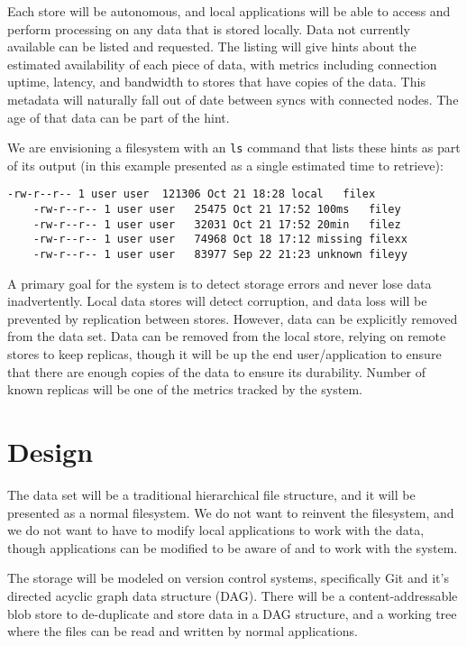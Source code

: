 \documentclass[12pt,a4paper,two-side]{book}
\begin{document}
Each store will be autonomous, and local applications will be able to access and
perform processing on any data that is stored locally. Data not currently
available can be listed and requested. The listing will give hints about the
estimated availability of each piece of data, with metrics including connection
uptime, latency, and bandwidth to stores that have copies of the data. This
metadata will naturally fall out of date between syncs with connected nodes. The
age of that data can be part of the hint.

We are envisioning a filesystem with an \lstinline{ls} command that lists these
hints as part of its output (in this example presented as a single estimated
time to retrieve):

\begin{lstlisting}[caption=Example ls output]
    -rw-r--r-- 1 user user  121306 Oct 21 18:28 local   filex
    -rw-r--r-- 1 user user   25475 Oct 21 17:52 100ms   filey
    -rw-r--r-- 1 user user   32031 Oct 21 17:52 20min   filez
    -rw-r--r-- 1 user user   74968 Oct 18 17:12 missing filexx
    -rw-r--r-- 1 user user   83977 Sep 22 21:23 unknown fileyy
\end{lstlisting}

A primary goal for the system is to detect storage errors and never lose data
inadvertently. Local data stores will detect corruption, and data loss will be
prevented by replication between stores. However, data can be explicitly removed
from the data set. Data can be removed from the local store, relying on remote
stores to keep replicas, though it will be up the end user/application to ensure
that there are enough copies of the data to ensure its durability. Number of
known replicas will be one of the metrics tracked by the system.









\chapter{Design}

The data set will be a traditional hierarchical file structure, and it will be
presented as a normal filesystem. We do not want to reinvent the filesystem, and
we do not want to have to modify local applications to work with the data,
though applications can be modified to be aware of and to work with the system.

The storage will be modeled on version control systems, specifically Git and
it's directed acyclic graph data structure (DAG). There will be a
content-addressable blob store to de-duplicate and store data in a DAG
structure, and a working tree where the files can be read and written by normal
applications.
\end{document}
